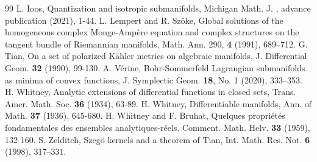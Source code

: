 \documentclass[12pt,oneside]{amsart}
\theoremstyle{plain}
\theoremstyle{definition}
\theoremstyle{remark}
\begin{document}
\begin{thebibliography}{99}
L. Ioos, 
Quantization and isotropic submanifolds, Michigan Math. J. , advance publication (2021), 1-44.  
L. Lempert and R. Sz\"oke, 
Global solutions of the homogeneous complex Monge-Amp\`ere equation and complex structures on the tangent bundle of Riemannian manifolds, Math. Ann. 290, {\bf 4} (1991), 689--712.  
G. Tian, On a set of polarized K\"ahler metrics on algebraic manifolds, J. Differential Geom. {\bf 32} (1990), 99-130.  
A. V\'erine, 
Bohr-Sommerfeld Lagrangian submanifolds as minima of convex functions, 
J. Symplectic Geom. {\bf 18}, No. 1 (2020), 333--353.  
H. Whitney, Analytic extensions of differential functions in closed sets, Trans.
Amer. Math. Soc. {\bf 36} (1934), 63-89.  
H. Whitney, Differentiable manifolds, Ann. of Math. {\bf 37} (1936), 645-680.  
H. Whitney and F. Bruhat, 
Quelques propri\'et\'es fondamentales des ensembles analytiques-r\'eels.  
Comment. Math. Helv. {\bf 33}  (1959), 132-160.
S. Zelditch, Szeg\"o kernels and a theorem of Tian, Int. Math. Res. Not. {\bf 6} (1998), 317--331.  

\end{thebibliography}

\vspace{5mm}

\par{}
\par{}
\end{document}
